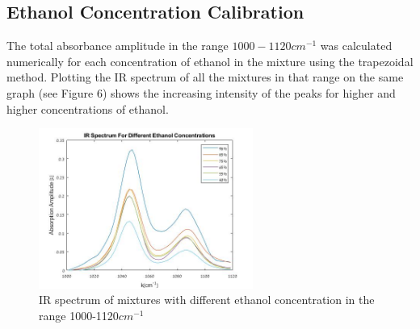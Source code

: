 \documentclass[reprint,amsmath,amssymb,aps, prl]{revtex4-2}
\begin{document}
\subsection{Ethanol Concentration Calibration}
The total absorbance amplitude in the range $1000-1120 cm^{-1}$ was calculated numerically
for each concentration of ethanol in the mixture using the trapezoidal method\cite{numerical}.
Plotting the IR spectrum of all the mixtures in that range
on the same graph (see Figure 6)
shows the increasing intensity of the peaks for higher and higher concentrations of ethanol. 
\begin{figure}[h]
    \includegraphics[width=7cm]{Images/EthanolAbsorption.jpg}
    \caption{IR spectrum of mixtures with different ethanol concentration in the range 1000-1120$cm^{-1}$ }
    \label{fig:EthanolMixtures}
    \centering
\end{figure}
\end{document}
